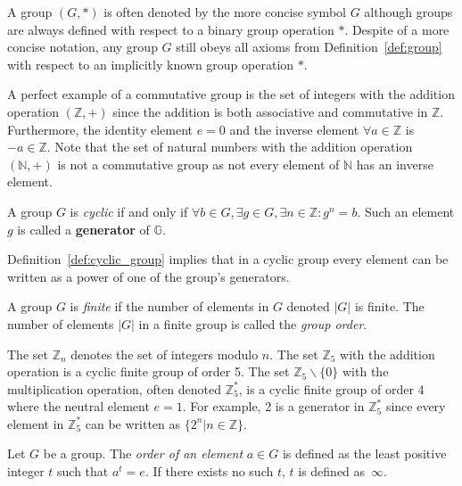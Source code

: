 A group $\left( G, * \right)$ is often denoted by the more concise symbol $G$ although groups are always defined with respect to a binary group operation $*$. Despite of a more concise notation, any group $G$ still obeys all axioms from Definition~\ref{def:group} with respect to an implicitly known group operation $*$.

A perfect example of a commutative group is the set of integers with the addition operation $\left( \mathbb{Z}, + \right)$ since the addition is both associative and commutative in $\mathbb{Z}$. Furthermore, the identity element $e = 0$ and the inverse element $\forall a \in \mathbb{Z}$ is $-a \in \mathbb{Z}$. Note that the set of natural numbers with the addition operation $\left( \mathbb{N}, + \right)$ is not a commutative group as not every element of $\mathbb{N}$ has an inverse element.

\begin{defn}
\label{def:cyclic_group}
 A group $G$ is \textit{cyclic} if and only if $\forall b \in G, \exists g \in G,\exists n \in \mathbb{Z}: g^n = b$. Such an element $g$ is called a \textbf{generator} of $\mathbb{G}$.
\end{defn}

Definition~\ref{def:cyclic_group} implies that in a cyclic group every element can be written as a power of one of the group's generators.

\begin{defn}
\label{def:finite_group}
 A group $G$ is \textit{finite} if the number of elements in $G$ denoted $|G|$ is finite. The number of elements $|G|$ in a finite group is called the \textit{group order}.
\end{defn}

The set $\mathbb{Z}_n$ denotes the set of integers modulo $n$. The set $\mathbb{Z}_5$ with the addition operation is a cyclic finite group of order 5. The set $\mathbb{Z}_5 \backslash \{0\}$ with the multiplication operation, often denoted $\mathbb{Z}^{*}_5$, is a cyclic finite group of order 4 where the neutral element $e=1$. For example, 2 is a generator in $\mathbb{Z}^{*}_5$ since every element in $\mathbb{Z}^{*}_5$ can be written as $\{ 2^n | n \in \mathbb{Z} \}$.

\begin{defn}
\label{def:order_of_an_element}
Let $G$ be a group. The \textit{order of an element} $a \in G$ is defined as the least positive integer $t$ such that $a^t = e$. If there exists no such $t$, $t$ is defined as~$\infty$.
\end{defn}

